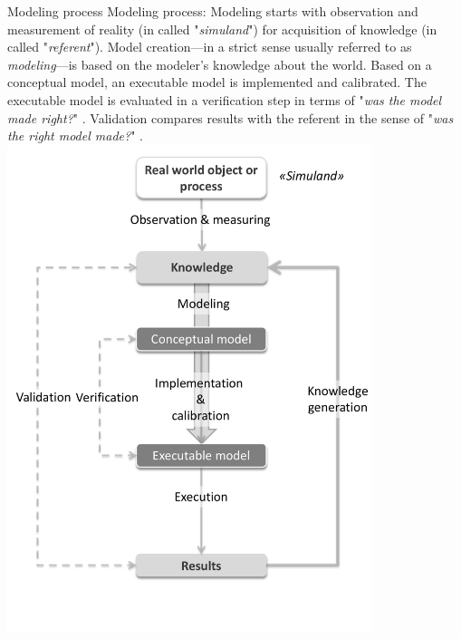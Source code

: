 \createfigure%
{Modeling process}%
{Modeling process: Modeling starts with observation and measurement of reality (in \citet[][]{Petty_SokolowskiBanks_2010} called "\emph{simuland}") for acquisition of knowledge (in \citet[][]{Petty_SokolowskiBanks_2010} called "\emph{referent}"). Model creation---in a strict sense usually referred to as \emph{modeling}---is based on the modeler's knowledge about the world. Based on a conceptual model, an executable model is implemented and calibrated. The executable model is evaluated in a verification step in terms of "\emph{was the model made right?}" \citep[][p.332]{Petty_SokolowskiBanks_2010}. Validation compares results with the referent in the sense of "\emph{was the right model made?}" \citep[][p.332]{Petty_SokolowskiBanks_2010}.}%
{\label{fig:modeling}}%
{\includegraphics[width=0.8\textwidth, angle=0]{using/figures/modeling.pdf}}%
{}


